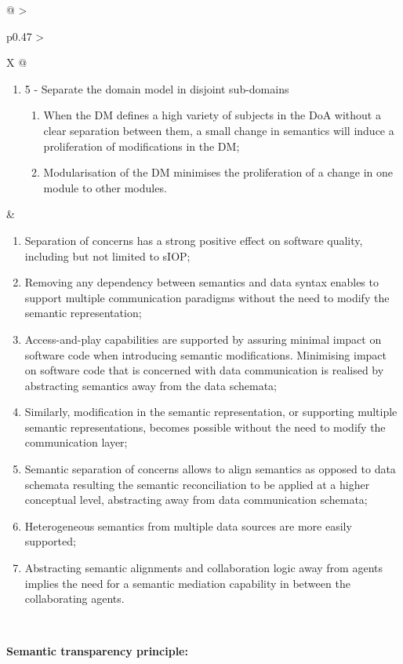 \begin{xltabular}[l]{\linewidth}{@{} >{\small\raggedright\arraybackslash}p{0.47\linewidth} >{\small\raggedright\arraybackslash}X @{}}
\begin{enumerate}[left=6pt, nosep]
\begin{enumerate}
    \item 
    \item .
  \end{enumerate}
  \item 5 - Separate the domain model in disjoint sub-domains
  \begin{enumerate}
    \item When the DM defines a high variety of subjects in the DoA without a clear separation between them, a small change in semantics will induce a proliferation of modifications in the DM;
    \item Modularisation of the DM minimises the proliferation of a change in one module to other modules.
  \end{enumerate}
\end{enumerate}
&
\begin{enumerate}[left=10pt, nosep]
  \item Separation of concerns has a strong positive effect on software quality, including but not limited to sIOP;
  \item Removing any dependency between semantics and data syntax enables to support multiple communication paradigms without the need to modify the semantic representation;
  \item Access-and-play capabilities are supported by assuring minimal impact on software code when introducing semantic modifications. Minimising impact on software code that is concerned with data communication is realised by abstracting semantics away from the data schemata;
  \item Similarly, modification in the semantic representation, or supporting multiple semantic representations, becomes possible without the need to modify the communication layer;
  \item Semantic separation of concerns allows to align semantics as opposed to data schemata resulting the semantic reconciliation to be applied at a higher conceptual level, abstracting away from data communication schemata;
  \item Heterogeneous semantics from multiple data sources are more easily supported;
  \item Abstracting semantic alignments and collaboration logic away from agents implies the need for a semantic mediation capability in between the collaborating agents.
\end{enumerate} \\
%
%
%
\begin{mmdp}\label{dp:st}{\bfseries Semantic transparency principle:}

\end{mmdp}
\end{xltabular}
